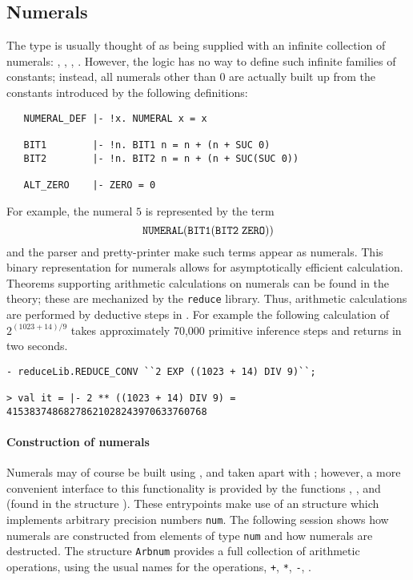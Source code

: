 \subsection{Numerals}\label{numeral}

The type 
is usually thought of as being supplied with an infinite collection of
numerals: , , , \etc.  However, the \HOL{} logic has
no way to define such infinite families of constants; instead, all
numerals other than $0$ are actually built up from the constants
introduced by the following definitions:
\begin{verbatim}
   NUMERAL_DEF |- !x. NUMERAL x = x

   BIT1        |- !n. BIT1 n = n + (n + SUC 0)
   BIT2        |- !n. BIT2 n = n + (n + SUC(SUC 0))

   ALT_ZERO    |- ZERO = 0
\end{verbatim}

\noindent For example, the numeral $5$ is represented by the term
\[
   \ml{NUMERAL}(\ml{BIT1}(\ml{BIT2}\;\ml{ZERO}))
\]
and the \HOL{} parser and pretty-printer make such terms appear as
numerals. This binary representation for numerals allows for
asymptotically efficient calculation. Theorems supporting arithmetic
calculations on numerals can be found in the 
theory; these are mechanized by the \verb+reduce+ library. Thus,
arithmetic calculations are performed by deductive steps in \HOL.
For example the following calculation of $2 ^{(1023 + 14)/9}$ takes
approximately 70,000 primitive inference steps and returns in two
seconds.
%
\begin{boxed}
{\small
\begin{verbatim}
- reduceLib.REDUCE_CONV ``2 EXP ((1023 + 14) DIV 9)``;

> val it = |- 2 ** ((1023 + 14) DIV 9) = 41538374868278621028243970633760768
\end{verbatim}
}
\end{boxed}

\paragraph {Construction of numerals}

Numerals may of course be built using , and taken apart with
; however, a more convenient interface to this
functionality is provided by the functions ,
, and  (found in the structure
). These entrypoints make use of an \ML{} structure
 which implements arbitrary precision numbers {\verb+num+}. The
following session shows how \HOL{} numerals are constructed from elements of
type \verb+num+ and how numerals are destructed. The structure
{\small\verb+Arbnum+} provides a full collection of arithmetic
operations, using the usual names for the operations, \eg \verb|+|,
\verb|*|, \verb|-|, \etc.


